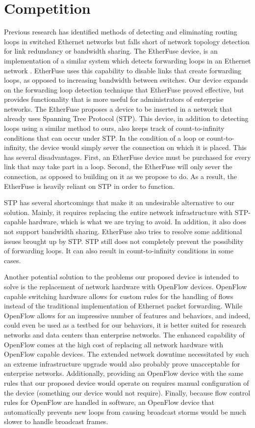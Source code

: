 \documentclass{article}
\begin{document}
\section{Competition}
	Previous research has identified methods of detecting and eliminating routing loops in switched Ethernet networks but falls short of network topology detection for link redundancy or bandwidth sharing.
	The EtherFuse device, is an implementation of a similar system which detects forwarding loops in an Ethernet network \cite{etherfuse}.
	EtherFuse uses this capability to disable links that create forwarding loops, as opposed to increasing bandwidth between switches.
	Our device expands on the forwarding loop detection technique that EtherFuse proved effective, but provides functionality that is more useful for administrators of enterprise networks.
	The EtherFuse proposes a device to be inserted in a network that already uses Spanning Tree Protocol (STP).
	This device, in addition to detecting loops using a similar method to ours, also keeps track of count-to-infinity conditions that can occur under STP.
	In the condition of a loop or count-to-infinity, the device would simply sever the connection on which it is placed.
	This has several disadvantages.
	First, an EtherFuse device must be purchased for every link that may take part in a loop.
	Second, the EtherFuse will only sever the connection, as opposed to building on it as we propose to do.
	As a result, the EtherFuse is heavily reliant on STP in order to function.
	
	STP has several shortcomings that make it an undesirable alternative to our solution.
	Mainly, it requires replacing the entire network infrastructure with STP-capable hardware, which is what we are trying to avoid.
	In addition, it also does not support bandwidth sharing.
	EtherFuse also tries to resolve some additional issues brought up by STP\cite{etherfuse}.
	STP still does not completely prevent the possibility of forwarding loops.
	It can also result in count-to-infinity conditions in some cases.
	
	Another potential solution to the problems our proposed device is intended to solve is the replacement of network hardware with OpenFlow devices.
	OpenFlow capable switching hardware allows for custom rules for the handling of flows instead of the traditional implementation of Ethernet packet forwarding.
	While OpenFlow allows for an impressive number of features and behaviors, and indeed, could even be used as a testbed for our behaviors, it is better suited for research networks and data centers than enterprise networks.
	The enhanced capability of OpenFlow comes at the high cost of replacing all network hardware with OpenFlow capable devices.
	The extended network downtime necessitated by such an extreme infrastructure upgrade would also probably prove unacceptable for enterprise networks.
	Additionally, providing an OpenFlow device with the same rules that our proposed device would operate on requires manual configuration of the device (something our device would not require).
	Finally, because flow control rules for OpenFlow are handled in software, an OpenFlow device that automatically prevents new loops from causing broadcast storms would be much slower to handle broadcast frames.
\end{document}
